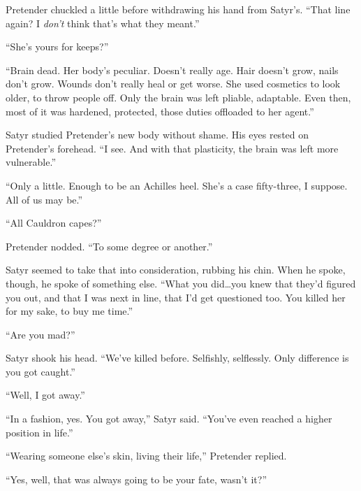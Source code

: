 Pretender chuckled a little before withdrawing his hand from Satyr's.  ``That line again?  I \emph{don't} think that's what they meant.''



``She's yours for keeps?''



``Brain dead.  Her body's peculiar.  Doesn't really age.  Hair doesn't grow, nails don't grow.  Wounds don't really heal or get worse.  She used cosmetics to look older, to throw people off.  Only the brain was left pliable, adaptable.  Even then, most of it was hardened, protected, those duties offloaded to her agent.''



Satyr studied Pretender's new body without shame.  His eyes rested on Pretender's forehead.  ``I see.  And with that plasticity, the brain was left more vulnerable.''



``Only a little.  Enough to be an Achilles heel.  She's a case fifty-three, I suppose.  All of us may be.''



``All Cauldron capes?''



Pretender nodded.  ``To some degree or another.''



Satyr seemed to take that into consideration, rubbing his chin.  When he spoke, though, he spoke of something else.  ``What you did\ldots you knew that they'd figured you out, and that I was next in line, that I'd get questioned too.  You killed her for my sake, to buy me time.''



``Are you mad?''



Satyr shook his head.  ``We've killed before.  Selfishly, selflessly.  Only difference is you got caught.''



``Well, I got away.''



``In a fashion, yes.  You got away,'' Satyr said.  ``You've even reached a higher position in life.''



``Wearing someone else's skin, living their life,'' Pretender replied.



``Yes, well, that was always going to be your fate, wasn't it?''



